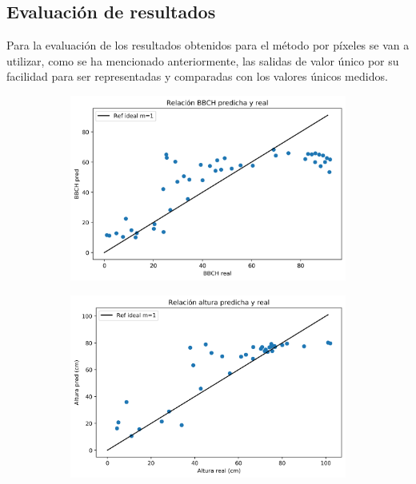 \subsection{Evaluación de resultados}
\par Para la evaluación de los resultados obtenidos para el método por píxeles se van a utilizar, como se ha mencionado anteriormente, las salidas de valor único por su facilidad para ser representadas y comparadas con los valores únicos medidos. 
\\
\begin{figure}[H]
\centering
\begin{subfigure}{.7\textwidth}
\includegraphics[width=0.95\linewidth]{archivos/tfg/Pixel/BBCH_RELACION_BIEN}
\end{subfigure}
\begin{subfigure}{.7\textwidth}
\centering
\includegraphics[width=0.95\linewidth]{archivos/tfg/Pixel/H_RELACION_BIEN}
\end{subfigure}
\end{figure}

